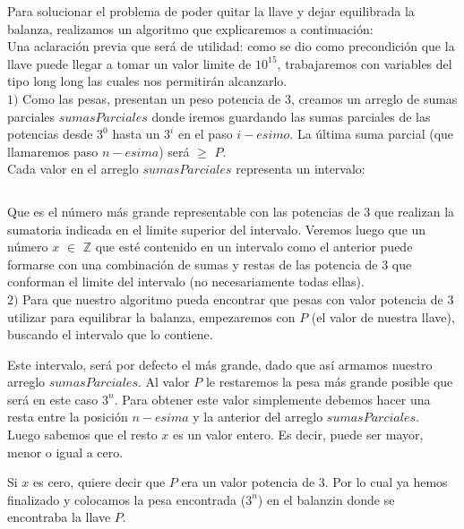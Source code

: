 
Para solucionar el problema de poder quitar la llave y dejar equilibrada la balanza, realizamos un algoritmo que explicaremos a continuaci\'on:\\

Una aclaraci\'on previa que ser\'a de utilidad: como se dio como precondici\'on que la llave puede llegar a tomar un valor limite de $10^{15}$, trabajaremos con variables del tipo long long las cuales nos permitir\'an alcanzarlo.\\

$1)$ Como las pesas, presentan un peso potencia de 3, creamos un arreglo de sumas parciales $sumasParciales$ donde iremos guardando las sumas parciales de las potencias desde $3^0$ hasta un $3^i$ en el paso $i-esimo$. La última suma parcial (que llamaremos paso $n-esima$) será $\geq$ $P$.\\

Cada valor en el arreglo $sumasParciales$ representa un intervalo:

\begin{equation}
[0, \sum_{j=0}^{i}(3^j)]
\end{equation} 

Que es el número más grande representable con las potencias de 3 que realizan la sumatoria indicada en el limite superior del intervalo.
Veremos luego que un número $x$ $\in$ $\mathbb{Z}$ que esté contenido en un intervalo como el anterior puede formarse con una combinación de sumas y restas de las potencia de 3 que conforman el limite del intervalo (no necesariamente todas ellas).\\  

$2)$ Para que nuestro algoritmo pueda encontrar que pesas con valor potencia de 3 utilizar para equilibrar la balanza, empezaremos con $P$ (el valor de nuestra llave), buscando el intervalo que lo contiene. 

Este intervalo, será por defecto el más grande, dado que así armamos nuestro arreglo $sumasParciales$. 
Al valor $P$ le restaremos la pesa más grande posible que será en este caso $3^n$. Para obtener este valor simplemente debemos hacer una resta entre la posición $n-esima$ y la anterior del arreglo $sumasParciales$.\\

Luego sabemos que el resto $x$ es un valor entero. Es decir, puede ser mayor, menor o igual a cero.

Si $x$ es cero, quiere decir que $P$ era un valor potencia de 3. Por lo cual ya hemos finalizado y colocamos la pesa encontrada ($3^n$) en el balanzin donde se encontraba la llave $P$.

